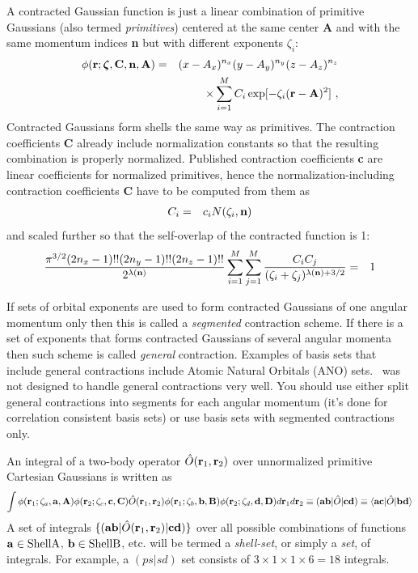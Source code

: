 \documentclass[10pt]{article}
\providecommand{\braket}[1]{\ensuremath{\langle #1 \rangle}}
\begin{document}
A contracted Gaussian function is just a linear combination of primitive Gaussians (also termed {\em primitives})
centered at the same center {\bf A} and with the same momentum indices {\bf n}
but with different exponents $\zeta_i$:
\begin{eqnarray}
\phi ({\bf r}; \bmath{\zeta}, {\bf C}, \n, {\bf A}) & = & (x - A_x)^{n_x} (y - A_y)^{n_y} (z - A_z)^{n_z} \nonumber \\
& & \times \sum_{i=1}^M C_i \exp [-\zeta_i ({\bf r}-{\bf A})^2]\ ,
\end{eqnarray}
Contracted Gaussians form shells the same way as primitives.
The contraction coefficients {\bf C} already include normalization constants so that the resulting combination
is properly normalized. Published contraction coefficients {\bf c} are linear coefficients for normalized primitives,
hence the normalization-including contraction coefficients {\bf C} have to be computed from them as
\begin{eqnarray} \label{eq:C1}
C_i & = & c_i N(\zeta_i,{\bf n})
\end{eqnarray}
and scaled further so that the self-overlap of the contracted function is 1:
\begin{eqnarray} \label{eq:C2}
\frac{\pi^{3/2} (2n_x-1)!!(2n_y-1)!!(2n_z-1)!!}{2^{\lambda({\bf n})}}
\sum_{i=1}^M \sum_{j=1}^M \frac{C_i C_j }{(\zeta_i+\zeta_j)^{\lambda({\bf n})+3/2}} & = & 1
\end{eqnarray}

If sets of orbital exponents are used to form contracted Gaussians of one angular momentum only
then this is called a {\em segmented} contraction scheme. If there is a set of exponents that forms
contracted Gaussians of several angular momenta then such scheme is called {\em general} contraction.
Examples of basis sets that include general contractions include Atomic Natural Orbitals (ANO) sets.
\LIBINT\ was not designed to handle general contractions very well. You should use either split general contractions
into segments for each angular momentum (it's done for correlation consistent basis sets)
or use basis sets with segmented contractions only.

An integral of a two-body operator $\hat{O}({\bf r}_1, {\bf r}_2)$ over unnormalized
primitive Cartesian Gaussians is written as
\begin{eqnarray}
\int \phi({\bf r}_1; \zeta_a, {\bf a}, {\bf A}) \phi ({\bf r}_2; \zeta_c, {\bf c}, \C) \hat{O}({\bf r}_1, {\bf r}_2)
\phi({\bf r}_1; \zeta_b, {\bf b}, \B) \phi({\bf r}_2; \zeta_d, {\bf d}, \D)
d{\bf r}_1 d{\bf r}_2 \equiv ({\bf ab} |\hat{O}|{\bf cd}) \equiv \braket{ {\bf
ac} | \hat{O} | {\bf bd} }
\end{eqnarray}
A set of integrals $\{ ({\bf a} {\bf b}|\hat{O}({\bf r}_1, {\bf r}_2)|{\bf c} {\bf d}) \}$
over all possible combinations of functions ${\bf a} \in {\rm Shell A}$, ${\bf b} \in {\rm Shell B}$, etc.
will be termed a {\em shell-set}, or simply a {\em set}, of integrals. For example, a $(ps|sd)$ set consists of
$3 \times 1 \times 1 \times 6 = 18$ integrals.
\end{document}
